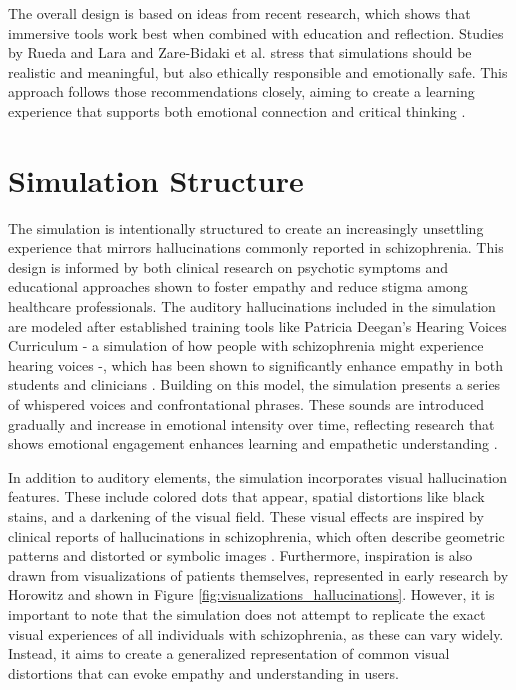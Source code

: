 \vspace{1em}
The overall design is based on ideas from recent research, which shows that immersive tools work best when combined with education and reflection. Studies by Rueda and Lara and Zare-Bidaki et al. stress that simulations should be realistic and meaningful, but also ethically responsible and emotionally safe. This approach follows those recommendations closely, aiming to create a learning experience that supports both emotional connection and critical thinking \cite{Rueda2020,Zare-Bidaki2022}.

\section{Simulation Structure}

The simulation is intentionally structured to create an increasingly unsettling experience that mirrors hallucinations commonly reported in schizophrenia. This design is informed by both clinical research on psychotic symptoms and educational approaches shown to foster empathy and reduce stigma among healthcare professionals. The auditory hallucinations included in the simulation are modeled after established training tools like Patricia Deegan’s Hearing Voices Curriculum - a simulation of how people with schizophrenia might experience hearing voices -, which has been shown to significantly enhance empathy in both students and clinicians \cite{Hsia2022}. Building on this model, the simulation presents a series of whispered voices and confrontational phrases. These sounds are introduced gradually and increase in emotional intensity over time, reflecting research that shows emotional engagement enhances learning and empathetic understanding \cite{Skoy2016}.

\vspace{1em}

In addition to auditory elements, the simulation incorporates visual hallucination features. These include colored dots that appear, spatial distortions like black stains, and a darkening of the visual field. These visual effects are inspired by clinical reports of hallucinations in schizophrenia, which often describe geometric patterns and distorted or symbolic images \cite{Silverstein2021,Vanommen2019}. Furthermore, inspiration is also drawn from visualizations of patients themselves, represented in early research by Horowitz \cite{Horowitz1964} and shown in Figure \ref{fig:visualizations_hallucinations}. However, it is important to note that the simulation does not attempt to replicate the exact visual experiences of all individuals with schizophrenia, as these can vary widely. Instead, it aims to create a generalized representation of common visual distortions that can evoke empathy and understanding in users.

